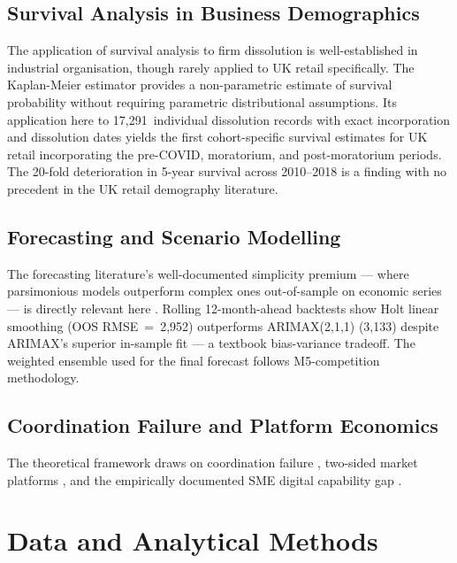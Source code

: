 \documentclass[12pt,a4paper]{article}
\begin{document}
\subsection{Survival Analysis in Business Demographics}

The application of survival analysis to firm dissolution is well-established in industrial
organisation, though rarely applied to UK retail specifically. The Kaplan-Meier estimator
\citep{KaplanMeier1958} provides a non-parametric estimate of survival probability without
requiring parametric distributional assumptions. Its application here to 17,291~individual
dissolution records with exact incorporation and dissolution dates yields the first
cohort-specific survival estimates for UK retail incorporating the pre-COVID, moratorium,
and post-moratorium periods. The 20-fold deterioration in 5-year survival across
2010--2018 is a finding with no precedent in the UK retail demography literature.

\subsection{Forecasting and Scenario Modelling}

The forecasting literature's well-documented simplicity premium --- where parsimonious
models outperform complex ones out-of-sample on economic series --- is directly relevant
here \citep{Makridakis1982}. Rolling 12-month-ahead backtests show Holt linear smoothing
(OOS RMSE~=~2,952) outperforms ARIMAX(2,1,1) (3,133) despite ARIMAX's superior
in-sample fit --- a textbook bias-variance tradeoff. The weighted ensemble used for the
final forecast follows M5-competition methodology.

\subsection{Coordination Failure and Platform Economics}

The theoretical framework draws on coordination failure \citep{Schelling1978,FarrellSaloner1985},
two-sided market platforms \citep{RochetTirole2003,ParkerVanAlstyne2005}, and the
empirically documented SME digital capability gap \citep{DBT2025}.


\section{Data and Analytical Methods}
\label{sec:data}
\end{document}
